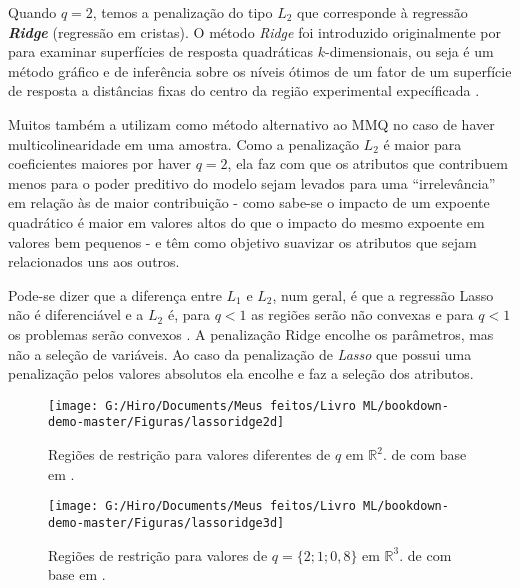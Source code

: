 \documentclass[
]{book}
\begin{document}
Quando \(q=2\), temos a penalização do tipo \textbf{\(L_2\)} que corresponde à regressão \textbf{\emph{Ridge}} (regressão em cristas). O método \emph{Ridge} foi introduzido originalmente por \citet{hoerl1959optimum} para examinar superfícies de resposta quadráticas \(k\)-dimensionais, ou seja é um método gráfico e de inferência sobre os níveis ótimos de um fator de um superfície de resposta a distâncias fixas do centro da região experimental expecíficada \citep{do2009metodo}.

Muitos também a utilizam como método alternativo ao MMQ no caso de haver multicolinearidade em uma amostra. Como a penalização \(L_2\) é maior para coeficientes maiores por haver \(q=2\), ela faz com que os atributos que contribuem menos para o poder preditivo do modelo sejam levados para uma ``irrelevância'' em relação às de maior contribuição - como sabe-se o impacto de um expoente quadrático é maior em valores altos do que o impacto do mesmo expoente em valores bem pequenos - e têm como objetivo suavizar os atributos que sejam relacionados uns aos outros.

Pode-se dizer que a diferença entre \(L_1\) e \(L_2\), num geral, é que a regressão Lasso não é diferenciável e a \(L_2\) é, para \(q<1\) as regiões serão não convexas e para \(q<1\) os problemas serão convexos \citep{silva2018tecnica}. A penalização Ridge encolhe os parâmetros, mas não a seleção de variáveis. Ao caso da penalização de \emph{Lasso} que possui uma penalização pelos valores absolutos ela encolhe e faz a seleção dos atributos.

\begin{figure}

{\centering \texttt{[image: G:/Hiro/Documents/Meus feitos/Livro ML/bookdown-demo-master/Figuras/lassoridge2d]} 

}

\caption{Regiões de restrição para valores diferentes de \(q\) em \(\mathbb{R}^2\). de \citet{silva2018tecnica} com base em \citet{hastie2015statistical}.}\label{fig:lassoridge2d}
\end{figure}



\begin{figure}

{\centering \texttt{[image: G:/Hiro/Documents/Meus feitos/Livro ML/bookdown-demo-master/Figuras/lassoridge3d]} 

}

\caption{Regiões de restrição para valores de \(q=\{2;1;0,8\}\) em \(\mathbb{R}^3\). de \citet{silva2018tecnica} com base em \citet{hastie2015statistical}.}\label{fig:lassoridge3d}
\end{figure}
\end{document}
